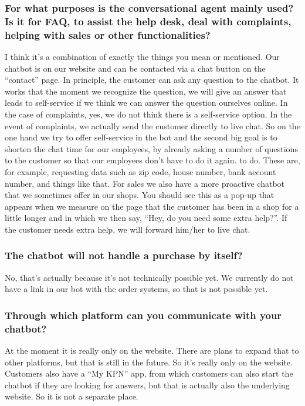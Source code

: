 \begin{appendices}
	\subsubsection{For what purposes is the conversational agent mainly used? Is it for FAQ,
		to assist the help desk, deal with complaints, helping with sales or other
		functionalities?}
	I think it's a combination of exactly the things you mean or mentioned. Our chatbot is on our website and can be contacted via a chat button on the “contact” page. In principle, the customer can ask any question to the chatbot. It works that the moment we recognize the question, we will give an answer that leads to self-service if we think we can answer the question ourselves online. In the case of complaints, yes, we do not think there is a self-service option. In the event of complaints, we actually send the customer directly to live chat. So on the one hand we try to offer self-service in the bot and the second big goal is to shorten the chat time for our employees, by already asking a number of questions to the customer so that our employees don't have to do it again. to do. These are, for example, requesting data such as zip code, house number, bank account number, and things like that. For sales we also have a more proactive chatbot that we sometimes offer in our shops. You should see this as a pop-up that appears when we measure on the page that the customer has been in a shop for a little longer and in which we then say, “Hey, do you need some extra help?”. If the customer needs extra help, we will forward him/her to live chat.
	
	\subsubsection{The chatbot will not handle a purchase by itself?}
	No, that's actually because it's not technically possible yet. We currently do not have a link in our bot with the order systems, so that is not possible yet.
	
	\subsubsection{Through which platform can you communicate with your chatbot?}
	At the moment it is really only on the website. There are plans to expand that to other platforms, but that is still in the future. So it's really only on the website. Customers also have a “My KPN” app, from which customers can also start the chatbot if they are looking for answers, but that is actually also the underlying website. So it is not a separate place.
	

\end{appendices}
